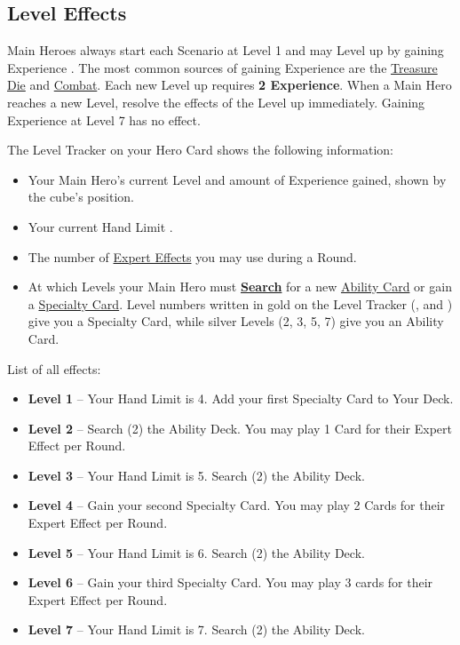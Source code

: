 
\clearpage

\begin{multicols}{2}

\subsection*{\hypertarget{Level}{Level Effects}}
Main Heroes always start each Scenario at Level 1 and may Level up by gaining Experience .
The most common sources of gaining Experience are the \hyperlink{Resources}{Treasure Die} and \hyperlink{Combatexperience}{Combat}.
Each new Level up requires \textbf{2 Experience}.
When a Main Hero reaches a new Level, resolve the effects of the Level up immediately.
Gaining Experience at Level 7 has no effect.\par
The Level Tracker on your Hero Card shows the following information:
\begin{itemize}
\item Your Main Hero's current Level and amount of Experience gained, shown by the cube's position.
\item Your current Hand Limit .
\item The number of \hyperlink{Ability}{Expert Effects}  you may use during a Round.
\item At which Levels your Main Hero must \hyperlink{Playerdecks}{\textbf{Search}} for a new \hyperlink{Ability}{Ability Card} or gain a \hyperlink{Specialty}{Specialty Card}.
Level numbers written in gold on the Level Tracker (,  and ) give you a Specialty Card, while silver Levels (2, 3, 5, 7) give you an Ability Card.
\end{itemize}
List of all effects:
\begin{itemize}
\item \textbf{Level 1} – Your Hand Limit is 4.
Add your first Specialty Card to Your Deck.
\item \textbf{Level 2} – Search (2) the Ability Deck.
You may play 1 Card for their Expert Effect per Round.
\item \textbf{Level 3} – Your Hand Limit is 5.
Search (2) the Ability Deck.
\item \textbf{Level 4} – Gain your second Specialty Card.
You may play 2 Cards for their Expert Effect per Round.
\item \textbf{Level 5} – Your Hand Limit is 6.
Search (2) the Ability Deck.
\item \textbf{Level 6} – Gain your third Specialty Card.
You may play 3 cards for their Expert Effect per Round.
\item \textbf{Level 7} – Your Hand Limit is 7.
Search (2) the Ability Deck.
\end{itemize}


\end{multicols}
